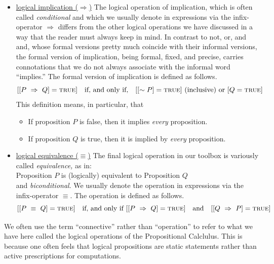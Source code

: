 \begin{itemize}
\item
\underline{logical implication ($\Rightarrow$)}
%
The logical operation of implication, which is often called {\it
  conditional} and which we usually denote in expressions via the
infix-operator $\Rightarrow$ differs from the other logical operations
we have discussed in a way that the reader must always keep in mind.
In contrast to {\small\sf not}, {\small\sf or}, and {\small\sf and},
whose formal versions pretty much coincide with their informal
versions, the formal version of implication, being formal, fixed, and
precise, carries connotations that we do not always associate with the
informal word ``implies.''  The formal version of implication is
defined as follows.
\[ [[P \ \Rightarrow \ Q] = \mbox{\sc true}]  \ \ \mbox{ if, and only
  if, } \ \
  [ [\sim P] = \mbox{\sc true}] \mbox{ (inclusive) or } [Q = \mbox{\sc true}]
\]
This definition means, in particular, that
  \begin{itemize}
  \item
If proposition $P$  is false, then it implies {\em every} proposition.
  \item
If proposition $Q$ is true, then it is implied by {\em every} proposition.
  \end{itemize}

\item
\underline{logical equivalence ($\equiv$)}
%
The final logical operation in our toolbox is variously called {\it
  equivalence,} as in: \\
\hspace*{.35in}Proposition $P$ is (logically) equivalent to
Proposition $Q$ \\
and {\it biconditional}.  We usually denote the operation in
expressions via the infix-operator $\equiv$.  The operation is defined
as follows.
\[ 
[[P \ \equiv \ Q] = \mbox{\sc true}]  \ \ \mbox{ if, and only if }
[[P \ \Rightarrow \ Q] = \mbox{\sc true}]  \ \ \mbox{ and } \ \
[[Q \ \Rightarrow \ P] = \mbox{\sc true}]
\]
\end{itemize}

We often use the term ``connective'' rather than ``operation'' to
refer to what we have here called the logical operations of the
Propositional Calclulus.  This is because one often feels that logical
propositions are static statements rather than active prescriptions
for computations.

